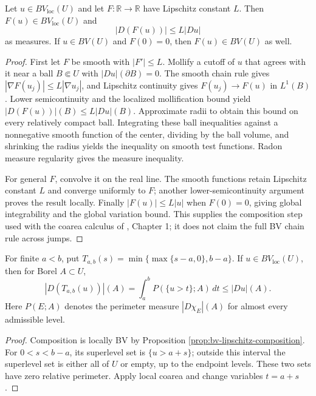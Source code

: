 \begin{proposition}\label{prop:bv-lipschitz-composition}
Let $u\in BV_{\mathrm{loc}}(U)$ and let $F:\mathbb R\to\mathbb R$ have Lipschitz constant $L$. Then $F(u)\in BV_{\mathrm{loc}}(U)$ and
\[
 |D(F(u))|\leq L|Du|
\]
as measures. If $u\in BV(U)$ and $F(0)=0$, then $F(u)\in BV(U)$ as well.
\end{proposition}
\begin{proof}
First let $F$ be smooth with $|F'|\leq L$. Mollify a cutoff of $u$ that agrees with it near a ball $B\Subset U$ with $|Du|(\partial B)=0$. The smooth chain rule gives $|\nabla F(u_j)|\leq L|\nabla u_j|$, and Lipschitz continuity gives $F(u_j)\to F(u)$ in $L^1(B)$. Lower semicontinuity and the localized mollification bound yield $|D(F(u))|(B)\leq L|Du|(B)$. Approximate radii to obtain this bound on every relatively compact ball. Integrating these ball inequalities against a nonnegative smooth function of the center, dividing by the ball volume, and shrinking the radius yields the inequality on smooth test functions. Radon measure regularity gives the measure inequality.

For general $F$, convolve it on the real line. The smooth functions retain Lipschitz constant $L$ and converge uniformly to $F$; another lower-semicontinuity argument proves the result locally. Finally $|F(u)|\leq L|u|$ when $F(0)=0$, giving global integrability and the global variation bound. This supplies the composition step used with the coarea calculus of \cite{Giu84}, Chapter 1; it does not claim the full BV chain rule across jumps.
\end{proof}

\begin{corollary}\label{cor:bv-truncation-coarea}
For finite $a<b$, put $T_{a,b}(s)=\min\{\max\{s-a,0\},b-a\}$. If $u\in BV_{\mathrm{loc}}(U)$, then for Borel $A\subset U$,
\[
 |D(T_{a,b}(u))|(A)=\int_a^bP(\{u>t\};A)\,dt\leq|Du|(A).
\]
Here $P(E;A)$ denotes the perimeter measure $|D\chi_E|(A)$ for almost every admissible level.
\end{corollary}
\begin{proof}
Composition is locally BV by Proposition \ref{prop:bv-lipschitz-composition}. For $0<s<b-a$, its superlevel set is $\{u>a+s\}$; outside this interval the superlevel set is either all of $U$ or empty, up to the endpoint levels. These two sets have zero relative perimeter. Apply local coarea and change variables $t=a+s$.
\end{proof}

